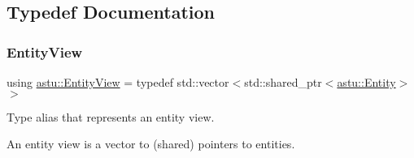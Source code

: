 \subsection{Typedef Documentation}
\mbox{\label{group__ecs__group_gace2fb790b86c3908a65e4222f7ac2f4e}} 
\subsubsection{\texorpdfstring{Entity\+View}{EntityView}}
{\footnotesize\ttfamily using \hyperlink{group__ecs__group_gace2fb790b86c3908a65e4222f7ac2f4e}{astu\+::\+Entity\+View} = typedef std\+::vector$<$std\+::shared\+\_\+ptr$<$\hyperlink{classastu_1_1Entity}{astu\+::\+Entity}$>$ $>$}

Type alias that represents an entity view.

An entity view is a vector to (shared) pointers to entities. 